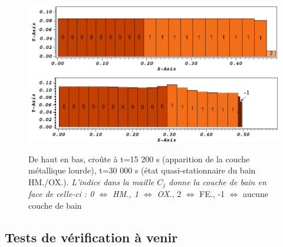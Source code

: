 \begin{figure}[H]
\centering
\includegraphics[width=\textwidth, keepaspectratio=true]{Figures/coriumCrust_15200.png} \\
\includegraphics[width=\textwidth, keepaspectratio=true]{Figures/coriumCrust_30000.png}
\caption{De haut en bas, croûte à t=15 200 s (apparition de la couche métallique lourde), t=30 000 s (état quasi-stationnaire du bain HM./OX.). \textit{L'indice dans la maille $C_j$ donne la couche de bain en face de celle-ci : 0 $\Leftrightarrow$ HM., 1 $\Leftrightarrow$ OX.}, 2  $\Leftrightarrow$ FE., -1 $\Leftrightarrow$ aucune couche de bain}
\label{fig:croutes_2}
\end{figure}


\subsection{Tests de vérification à venir}
